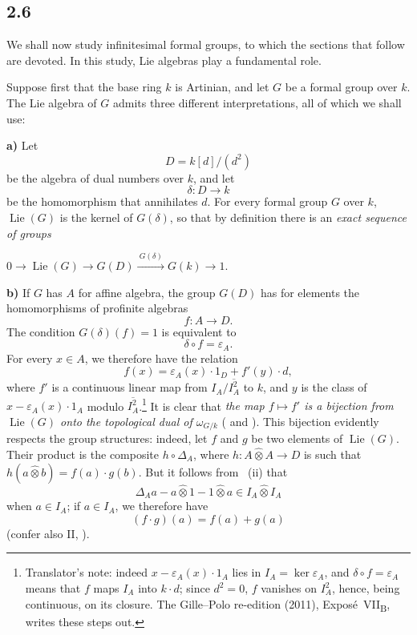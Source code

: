 
\subsection*{2.6}
\label{sga3:VIIB:2.6}

We shall now study infinitesimal formal groups, to which the sections
that follow are devoted. In this study, Lie algebras play a fundamental
role.

Suppose first that the base ring \(k\) is Artinian, and let \(G\) be a
formal group over \(k\). The Lie algebra of \(G\) admits three different
interpretations, all of which we shall use:

\medskip
\noindent\textbf{a)}
Let
\[
  D=k[d]/(d^2)
\]
be the algebra of dual numbers over \(k\), and let
\[
  \delta:D\longrightarrow k
\]
be the homomorphism that annihilates \(d\). For every formal group
\(G\) over \(k\), \(\operatorname{Lie}(G)\) is the kernel of
\(G(\delta)\), so that by definition there is an \emph{exact sequence of
groups}
\begin{center}
  \label{sga3:VIIB:2.6:dual-numbers-exact-sequence}
  \(
  0\longrightarrow\operatorname{Lie}(G)
  \longrightarrow G(D)
  \xrightarrow{\ G(\delta)\ }G(k)
  \longrightarrow1.
  \)
\end{center}

\medskip
\noindent\textbf{b)}
If \(G\) has \(A\) for affine algebra, the group \(G(D)\) has for
elements the homomorphisms of profinite algebras
\[
  f:A\longrightarrow D.
\]
The condition \(G(\delta)(f)=1\) is equivalent to
\[
  \delta\circ f=\varepsilon_A.
\]
For every \(x\in A\), we therefore have the relation
\[
  f(x)
  =
  \varepsilon_A(x)\cdot1_D+f'(y)\cdot d,
\]
where \(f'\) is a continuous linear map from \(I_A/\overline{I_A^2}\) to
\(k\), and \(y\) is the class of \(x-\varepsilon_A(x)\cdot1_A\) modulo
\(\overline{I_A^2}\).\footnote{Translator's note: indeed \(x-\varepsilon_A(x)\cdot1_A\) lies in
\(I_A=\ker\varepsilon_A\), and \(\delta\circ f=\varepsilon_A\) means that \(f\) maps \(I_A\) into
\(k\cdot d\); since \(d^2=0\), \(f\) vanishes on \(I_A^2\), hence, being continuous, on its closure. The
Gille--Polo re-edition (2011), Expos\'e~VII\textsubscript{B}, writes these steps out.} It is clear that \emph{the map \(f\mapsto f'\) is a
bijection from \(\operatorname{Lie}(G)\) onto the topological dual of
\(\omega_{G/k}\)} \textup{( and )}. This bijection evidently
respects the group structures: indeed, let \(f\) and \(g\) be two
elements of \(\operatorname{Lie}(G)\). Their product is the composite
\(h\circ\Delta_A\), where \(h:A\widehat\otimes A\to D\) is such that
\(h(a\widehat\otimes b)=f(a)\cdot g(b)\). But it follows from
~(ii) that
\[
  \Delta_A a-a\widehat\otimes1-1\widehat\otimes a
  \in
  I_A\widehat\otimes I_A
\]
when \(a\in I_A\); if \(a\in I_A\), we therefore have
\[
  (f\cdot g)(a)=f(a)+g(a)
\]
\textup{(confer also II, )}.


